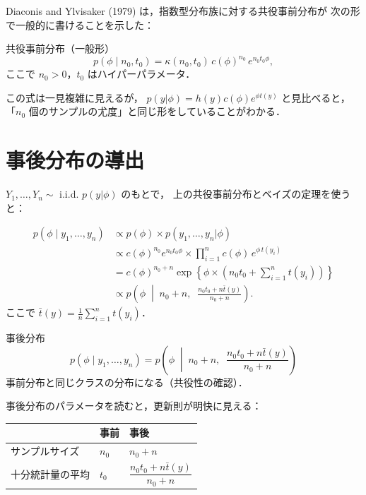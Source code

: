 \documentclass[lualatex,ja=standard,a4paper,12pt]{bxjsarticle}
\begin{document}
Diaconis and Ylvisaker (1979) は，指数型分布族に対する共役事前分布が
次の形で一般的に書けることを示した：

\begin{thmbox}{共役事前分布（一般形）}
\[
  p(\phi \mid n_0, t_0) = \kappa(n_0, t_0)\,c(\phi)^{n_0}\,e^{n_0 t_0 \phi},
\]
ここで $n_0 > 0$，$t_0$ はハイパーパラメータ．
\end{thmbox}

この式は一見複雑に見えるが，
$p(y|\phi) = h(y)c(\phi)e^{\phi t(y)}$ と見比べると，
「$n_0$ 個のサンプルの尤度」と同じ形をしていることがわかる．

\section{事後分布の導出}

$Y_1,\ldots,Y_n \sim$ i.i.d. $p(y|\phi)$ のもとで，
上の共役事前分布とベイズの定理を使うと：

\begin{derivbox}
\begin{align*}
  p(\phi \mid y_1,\ldots,y_n)
  &\propto p(\phi) \times p(y_1,\ldots,y_n|\phi) \\
  &\propto c(\phi)^{n_0} e^{n_0 t_0 \phi}
   \times \prod_{i=1}^n c(\phi)\,e^{\phi\,t(y_i)} \\
  &= c(\phi)^{n_0+n}
     \exp\!\left\{\phi \times \left(n_0 t_0 + \sum_{i=1}^n t(y_i)\right)\right\} \\
  &\propto p\!\left(\phi \;\middle|\; n_0 + n,\;\;
    \frac{n_0 t_0 + n\bar{t}(y)}{n_0 + n}\right).
\end{align*}
ここで $\bar{t}(y) = \frac{1}{n}\sum_{i=1}^n t(y_i)$．
\end{derivbox}

\begin{thmbox}{事後分布}
\[
  \boxed{
    p(\phi \mid y_1,\ldots,y_n)
    = p\!\left(\phi \;\middle|\; n_0 + n,\;\;
      \frac{n_0 t_0 + n\bar{t}(y)}{n_0 + n}\right)
  }
\]
事前分布と同じクラスの分布になる（共役性の確認）．
\end{thmbox}

事後分布のパラメータを読むと，更新則が明快に見える：

\medskip
\begin{center}
\renewcommand{\arraystretch}{1.6}
\begin{tabular}{lll}
\toprule
& 事前 & 事後 \\
\midrule
サンプルサイズ & $n_0$ & $n_0 + n$ \\
十分統計量の平均 & $t_0$ & $\dfrac{n_0 t_0 + n\bar{t}(y)}{n_0 + n}$ \\
\bottomrule
\end{tabular}
\end{center}
\end{document}
